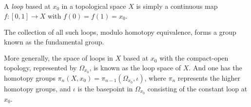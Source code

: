 \documentclass{article}
\begin{document}
A {\em loop} based at $x_0$ in a topological space $X$ is simply a continuous map $f : [0,1]\to X$ with $f(0) = f(1) = x_0$.

The collection of all such loops, modulo homotopy equivalence, forms a group known as the fundamental group.

More generally, the space of loops in $X$ based at $x_0$ with the compact-open topology, represented by $\Omega_{x_0}$, is known as the loop space of $X$.  And one has the homotopy groups $\pi_n(X,x_0) = \pi_{n-1}(\Omega_{x_0},\iota)$, where $\pi_n$ represents the higher homotopy groups, and $\iota$ is the basepoint in $\Omega_{x_0}$ consisting of the constant loop at $x_0$.
\end{document}
